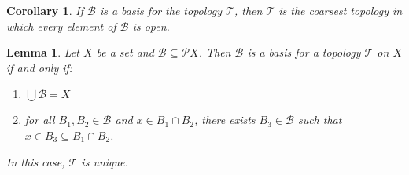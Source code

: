 \documentclass{report}
\newtheorem{lm}{Lemma}[section]
\newtheorem{cor}{Corollary}[lm]
\theoremstyle{definition}
\begin{document}
  \begin{cor}
    \label{cor:topology:basis:coarsest}
    If $\mathcal{B}$ is a basis for the topology $\mathcal{T}$, then
    $\mathcal{T}$ is the coarsest topology in which every element of
    $\mathcal{B}$ is open.
  \end{cor}

  \begin{lm}
    \label{lm:topology:basis:generate}
    Let $X$ be a set and $\mathcal{B} \subseteq \mathcal{P} X$. Then
    $\mathcal{B}$ is a basis for a topology $\mathcal{T}$ on $X$ if and only if:
    \begin{enumerate}
      \item
      $\bigcup \mathcal{B} = X$
      \item
      for all $B_1, B_2 \in \mathcal{B}$ and $x \in B_1 \cap B_2$, there exists
      $B_3
      \in \mathcal{B}$ such that $x \in B_3 \subseteq B_1 \cap B_2$.
    \end{enumerate}
    In this case, $\mathcal{T}$ is unique.
  \end{lm}
\end{document}

